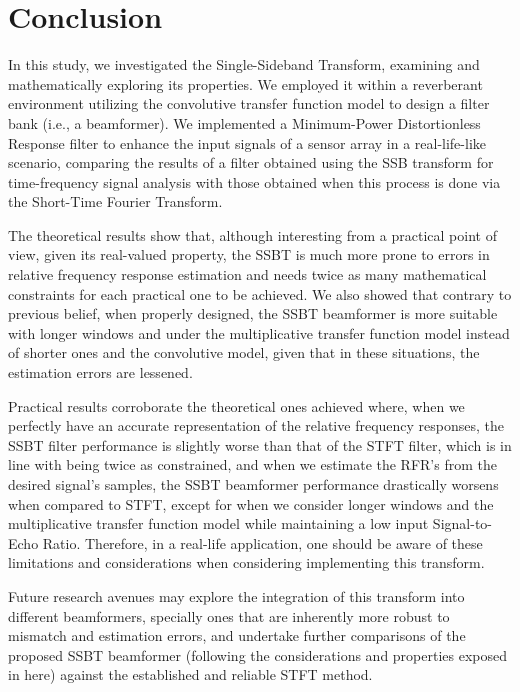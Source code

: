 \section{Conclusion}
\label{sec:conclusion}

In this study, we investigated the Single-Sideband Transform, examining and mathematically exploring its properties. We employed it within a reverberant environment utilizing the convolutive transfer function model to design a filter bank (i.e., a beamformer). We implemented a Minimum-Power Distortionless Response filter to enhance the input signals of a sensor array in a real-life-like scenario, comparing the results of a filter obtained using the SSB transform for time-frequency signal analysis with those obtained when this process is done via the Short-Time Fourier Transform.

The theoretical results show that, although interesting from a practical point of view, given its real-valued property, the SSBT is much more prone to errors in relative frequency response estimation and needs twice as many mathematical constraints for each practical one to be achieved. We also showed that contrary to previous belief, when properly designed, the SSBT beamformer is more suitable with longer windows and under the multiplicative transfer function model instead of shorter ones and the convolutive model, given that in these situations, the estimation errors are lessened.

Practical results corroborate the theoretical ones achieved where, when we perfectly have an accurate representation of the relative frequency responses, the SSBT filter performance is slightly worse than that of the STFT filter, which is in line with being twice as constrained, and when we estimate the RFR's from the desired signal's samples, the SSBT beamformer performance drastically worsens when compared to STFT, except for when we consider longer windows and the multiplicative transfer function model while maintaining a low input Signal-to-Echo Ratio. Therefore, in a real-life application, one should be aware of these limitations and considerations when considering implementing this transform.

Future research avenues may explore the integration of this transform into different beamformers, specially ones that are inherently more robust to mismatch and estimation errors, and undertake further comparisons of the proposed SSBT beamformer (following the considerations and properties exposed in here) against the established and reliable STFT method.